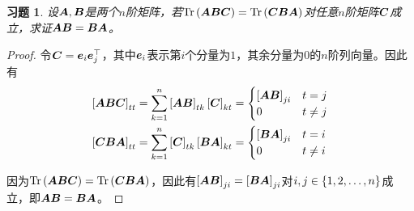\documentclass{ctexart}
\newtheorem{problem}{习题}[section]
\begin{document}
\begin{problem}
设\(\mata,\matb\)是两个\(n\)阶矩阵，若\(\trace{\mata\matb\matc}=\trace{\matc\matb\mata}\)对任意\(n\)阶矩阵\(\matc\)成立，求证\(\mata\matb=\matb\mata\)。
\end{problem}
\begin{proof}
令\(\matc=\vece_i\vece_j^\top\)，其中\(\vece_i\)表示第\(i\)个分量为\(1\)，其余分量为\(0\)的\(n\)阶列向量。因此有
    \begin{align*}
        \mat{\mata\matb\matc}_{tt} & =\sum_{k=1}^n\mat{\mata\matb}_{tk}\mat{\matc}_{kt}=
        \begin{cases}
            \mat{\mata\matb}_{ji} & t=j     \\
            0                     & t\neq j
        \end{cases}                                                       \\
        \mat{\matc\matb\mata}_{tt} & =\sum_{k=1}^n\mat{\matc}_{tk}\mat{\matb\mata}_{kt}=
        \begin{cases}
            \mat{\matb\mata}_{ji} & t=i     \\
            0                     & t\neq i
        \end{cases}
    \end{align*}

    因为\(\trace{\mata\matb\matc}=\trace{\matc\matb\mata}\)，因此有\(\mat{\mata\matb}_{ji}=\mat{\matb\mata}_{ji}\)对\(i,j\in\setof{1,2,\dots,n}\)成立，即\(\mata\matb=\matb\mata\)。
\end{proof}
\end{document}
